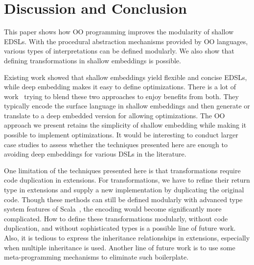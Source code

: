 \section{Discussion and Conclusion}
This paper shows how OO programming improves the modularity of shallow EDSLs.
With the procedural abstraction mechanisms provided by OO languages, various types of
interpretations can be defined modularly. We also show that defining
transformations in shallow embeddings is possible.

Existing work showed that shallow embeddings yield flexible and
concise EDSLs, while deep embedding makes it easy to define
optimizations. There is a lot of work~\cite{svenningsson2012combining,
  Jovanovic:2014:YCD:2658761.2658771, scherr2014implicit} trying to blend these two
approaches to enjoy benefits from both.
They typically encode the surface language in shallow embeddings and
then generate or translate to a deep embedded version for allowing optimizations.
The OO approach we present retains the simplicity of shallow embedding while
making it possible to implement optimizations. It would be interesting
to conduct larger case studies to assess whether the techniques
presented here are enough to avoiding deep embeddings for various DSLs
in the literature. 

One limitation of the techniques presented here is that
transformations require code duplication in extensions.  For
transformations, we have to refine their return type in extensions and
supply a new implementation by duplicating the original code. 
Though these methods can still be defined modularly with advanced type
system features of Scala~\cite{zenger05independentlyextensible},
the encoding would become significantly more complicated.
How to define these transformations modularly, without code
duplication, and without sophisticated types
is a possible line of future work.  Also, it is tedious to
express the inheritance relationships in extensions, especially when
multiple inheritance is used. Another line of future work is to use
some meta-programming mechanisms to eliminate such boilerplate.
